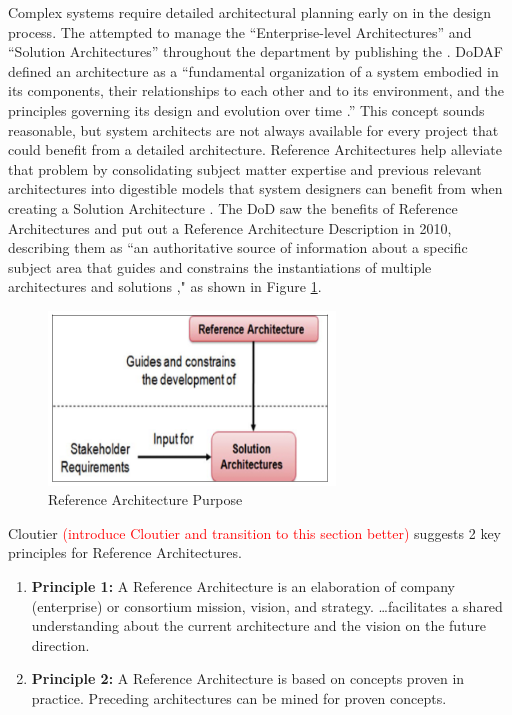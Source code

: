 Complex systems require detailed architectural planning early on in the design process. The  attempted to manage the “Enterprise-level Architectures” and “Solution Architectures” throughout the department by publishing the . DoDAF defined an architecture as a “fundamental organization of a system embodied in its components, their relationships to each other and to its environment, and the principles governing its design and evolution over time \citep{DoDAF}.” This concept sounds reasonable, but system architects are not always available for every project that could benefit from a detailed architecture. Reference Architectures help alleviate that problem by consolidating subject matter expertise and previous relevant architectures into digestible models that system designers can benefit from when creating a Solution Architecture \citep{Cloutier2010}. The DoD saw the benefits of Reference Architectures and put out a Reference Architecture Description in 2010, describing them as “an authoritative source of information about a  specific subject area that guides and constrains the instantiations of multiple  architectures and solutions \citep{RADescription}," as shown in Figure \ref{fig:Ref Arc Purpose}.

\begin{figure}[!h]
    \centering
    \includegraphics[width=3in]{Thesis/Literature_Review/Lit Review Figures/Ref Arc Purpose.png}
    \caption{Reference Architecture Purpose}
    \label{fig:Ref Arc Purpose}
\end{figure}

Cloutier \textcolor{red}{(introduce Cloutier and transition to this section better)} suggests 2 key principles for Reference Architectures.
\begin{enumerate}
\item{\textbf{Principle 1:} A Reference Architecture is an elaboration of company (enterprise) or consortium mission, vision, and strategy.   …facilitates a shared understanding about the current architecture and the vision on the future direction.}
\item{\textbf{Principle 2:} A Reference Architecture is based on concepts proven in practice. Preceding architectures can be mined for proven concepts.}
\end{enumerate}

